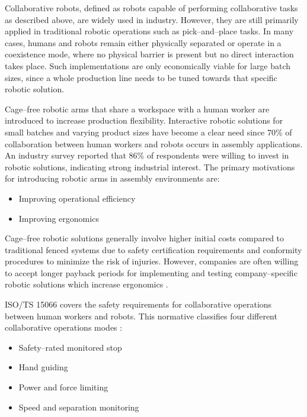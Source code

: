\documentclass[11pt,a4paper,twoside,openright]{book}
\begin{document}
Collaborative robots, defined as robots capable of performing collaborative tasks as described above, are widely used in industry. However, they are still primarily applied in traditional robotic operations such as pick--and--place tasks. In many cases, humans and robots remain either physically separated or operate in a coexistence mode, where no physical barrier is present but no direct interaction takes place. Such implementations are only economically viable for large batch sizes, since a whole production line needs to be tuned towards that specific robotic solution. 

Cage--free robotic arms that share a workspace with a human worker are introduced to increase production flexibility. Interactive robotic solutions for small batches and varying product sizes have become a clear need since 70\% of collaboration between human workers and robots occurs in assembly applications. An industry survey reported that 86\% of respondents were willing to invest in robotic solutions, indicating strong industrial interest. The primary motivations for introducing robotic arms in assembly environments are:

\vspace{0.2cm} 
\begin{itemize}[noitemsep, topsep=0pt]
	\item Improving operational efficiency
	\item Improving ergonomics
\end{itemize}
\vspace{0.3cm}

Cage--free robotic solutions generally involve higher initial costs compared to traditional fenced systems due to safety certification requirements and conformity procedures to minimize the risk of injuries. However, companies are often willing to accept longer payback periods for implementing and testing company--specific robotic solutions which increase ergonomics \cite{benderLightweightRobotsManual2016}\cite{europeanparliament.directorategeneralforparliamentaryresearchservices.AnalysisExploringRisks2023}.

ISO/TS 15066 covers the safety requirements for collaborative operations between human workers and robots. This normative classifies four different collaborative operations modes \cite{rosenstrauchHumanRobotCollaboration2018}\cite{chemwenoOrientingSafetyAssurance2020}: 

\vspace{0.2cm} 
\begin{itemize}[noitemsep, topsep=0pt]
	\item Safety--rated monitored stop
	\item Hand guiding
	\item Power and force limiting
	\item Speed and separation monitoring
\end{itemize}
\vspace{0.3cm}
\end{document}
